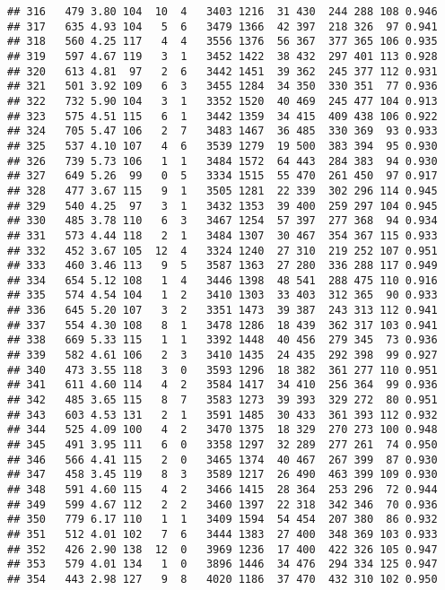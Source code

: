 \documentclass[]{article}
\begin{document}
\begin{verbatim}
## 316   479 3.80 104  10  4   3403 1216  31 430  244 288 108 0.946
## 317   635 4.93 104   5  6   3479 1366  42 397  218 326  97 0.941
## 318   560 4.25 117   4  4   3556 1376  56 367  377 365 106 0.935
## 319   597 4.67 119   3  1   3452 1422  38 432  297 401 113 0.928
## 320   613 4.81  97   2  6   3442 1451  39 362  245 377 112 0.931
## 321   501 3.92 109   6  3   3455 1284  34 350  330 351  77 0.936
## 322   732 5.90 104   3  1   3352 1520  40 469  245 477 104 0.913
## 323   575 4.51 115   6  1   3442 1359  34 415  409 438 106 0.922
## 324   705 5.47 106   2  7   3483 1467  36 485  330 369  93 0.933
## 325   537 4.10 107   4  6   3539 1279  19 500  383 394  95 0.930
## 326   739 5.73 106   1  1   3484 1572  64 443  284 383  94 0.930
## 327   649 5.26  99   0  5   3334 1515  55 470  261 450  97 0.917
## 328   477 3.67 115   9  1   3505 1281  22 339  302 296 114 0.945
## 329   540 4.25  97   3  1   3432 1353  39 400  259 297 104 0.945
## 330   485 3.78 110   6  3   3467 1254  57 397  277 368  94 0.934
## 331   573 4.44 118   2  1   3484 1307  30 467  354 367 115 0.933
## 332   452 3.67 105  12  4   3324 1240  27 310  219 252 107 0.951
## 333   460 3.46 113   9  5   3587 1363  27 280  336 288 117 0.949
## 334   654 5.12 108   1  4   3446 1398  48 541  288 475 110 0.916
## 335   574 4.54 104   1  2   3410 1303  33 403  312 365  90 0.933
## 336   645 5.20 107   3  2   3351 1473  39 387  243 313 112 0.941
## 337   554 4.30 108   8  1   3478 1286  18 439  362 317 103 0.941
## 338   669 5.33 115   1  1   3392 1448  40 456  279 345  73 0.936
## 339   582 4.61 106   2  3   3410 1435  24 435  292 398  99 0.927
## 340   473 3.55 118   3  0   3593 1296  18 382  361 277 110 0.951
## 341   611 4.60 114   4  2   3584 1417  34 410  256 364  99 0.936
## 342   485 3.65 115   8  7   3583 1273  39 393  329 272  80 0.951
## 343   603 4.53 131   2  1   3591 1485  30 433  361 393 112 0.932
## 344   525 4.09 100   4  2   3470 1375  18 329  270 273 100 0.948
## 345   491 3.95 111   6  0   3358 1297  32 289  277 261  74 0.950
## 346   566 4.41 115   2  0   3465 1374  40 467  267 399  87 0.930
## 347   458 3.45 119   8  3   3589 1217  26 490  463 399 109 0.930
## 348   591 4.60 115   4  2   3466 1415  28 364  253 296  72 0.944
## 349   599 4.67 112   2  2   3460 1397  22 318  342 346  70 0.936
## 350   779 6.17 110   1  1   3409 1594  54 454  207 380  86 0.932
## 351   512 4.01 102   7  6   3444 1383  27 400  348 369 103 0.933
## 352   426 2.90 138  12  0   3969 1236  17 400  422 326 105 0.947
## 353   579 4.01 134   1  0   3896 1446  34 476  294 334 125 0.947
## 354   443 2.98 127   9  8   4020 1186  37 470  432 310 102 0.950

\end{verbatim}
\end{document}
